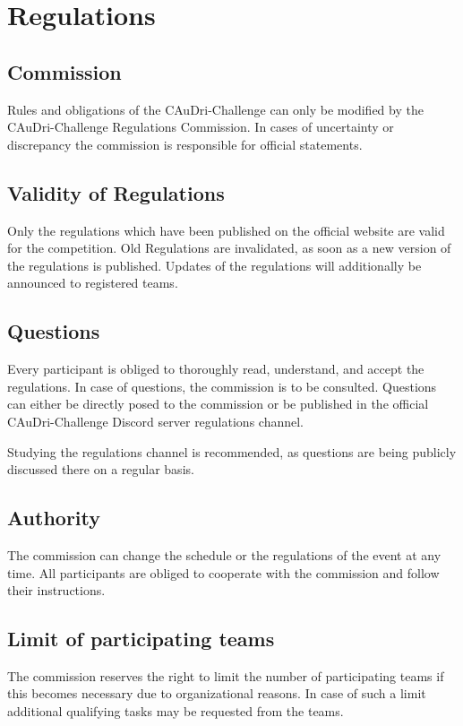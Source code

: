 \chapter{Regulations}

\section{Commission}

Rules and obligations of the CAuDri-Challenge can only be modified by the
CAuDri-Challenge Regulations Commission. In cases of uncertainty or discrepancy
the commission is responsible for official statements.

\section{Validity of Regulations}

Only the regulations which have been published on the official website are
valid for the competition. Old Regulations are invalidated, as soon as a new
version of the regulations is published. Updates of the regulations will
additionally be announced to registered teams.

\section{Questions}

Every participant is obliged to thoroughly read, understand, and accept the
regulations. In case of questions, the commission is to be consulted. Questions
can either be directly posed to the commission or be published in the official
CAuDri-Challenge Discord server regulations channel.

Studying the regulations channel is recommended, as questions are being
publicly discussed there on a regular basis.

\section{Authority}

The commission can change the schedule or the regulations of the event at any
time. All participants are obliged to cooperate with the commission and follow
their instructions.

\section{Limit of participating teams}

The commission reserves the right to limit the number of participating teams if
this becomes necessary due to organizational reasons. In case of such a limit
additional qualifying tasks may be requested from the teams.
